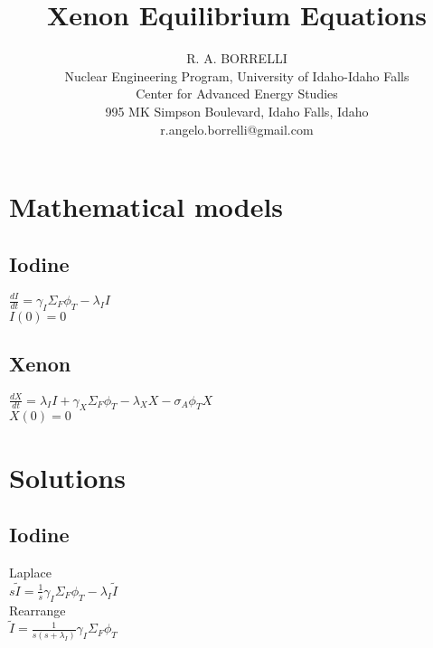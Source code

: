 \documentclass[11pt,a4paper]{article}
\begin{document}
\begin{titlepage}
            \title{Xenon Equilibrium Equations}
            \author{
                R. A. BORRELLI \\
                Nuclear Engineering Program, University of Idaho-Idaho Falls \\
                Center for Advanced Energy Studies \\
                995 MK Simpson Boulevard, Idaho Falls, Idaho \\
                r.angelo.borrelli@gmail.com
            }
\clearpage %
\maketitle
\thispagestyle{empty} %
\end{titlepage}

\section{Mathematical models}
\subsection{Iodine}
$\frac{dI}{dt}=\gamma_I \Sigma_F \phi_T-\lambda_I I$ \\
$I(0)=0$

\subsection{Xenon}
$\frac{dX}{dt}=\lambda_I I + \gamma_X \Sigma_F \phi_T - \lambda_X X - \sigma_A \phi_T X$ \\
$X(0)=0$

\section{Solutions}
\subsection{Iodine}
Laplace \\
$s\tilde{I}=\frac{1}{s}\gamma_I\Sigma_F\phi_T-\lambda_I\tilde{I}$ \\

\noindent Rearrange \\
$\tilde{I}=\frac{1}{s(s+\lambda_I)}\gamma_I\Sigma_F\phi_T$ \\
\end{document}

